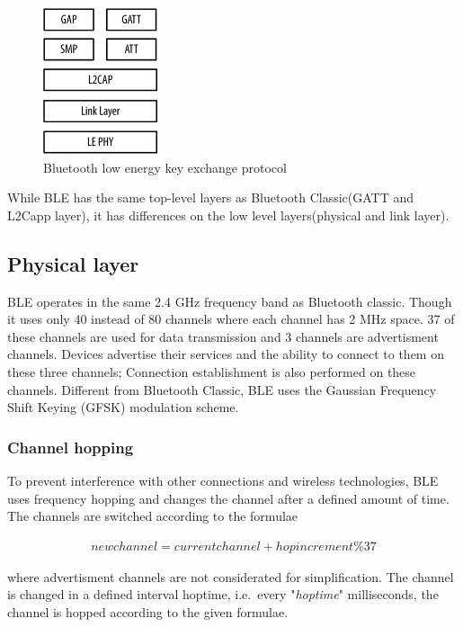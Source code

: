 \documentclass[conference]{IEEEtran}
\begin{document}
\begin{figure}
  \centering
    \includegraphics[width=0.3\textwidth]{layers}
    \caption{Bluetooth low energy key exchange protocol}
  \label{fig:layers}
\end{figure}


While BLE has the same top-level layers as Bluetooth Classic(GATT and L2Capp layer), it has differences on the low level layers(physical and link layer).

\subsection{Physical layer} \label{ssec:phy}

BLE operates in the same 2.4 GHz frequency band as Bluetooth classic. Though it uses only 40 instead of 80 channels where each channel has 2 MHz space. 37 of these channels are used for data transmission and 3 channels are advertisment channels. Devices advertise their services and the ability to connect to them on these three channels; Connection establishment is also performed on these channels. Different from Bluetooth Classic, BLE uses the Gaussian Frequency Shift Keying (GFSK) modulation scheme.

\subsubsection{Channel hopping}

To prevent interference with other connections and wireless technologies, BLE uses frequency hopping and changes the channel after a defined amount of time. The channels are switched according to the formulae

\begin{align*}
  newchannel = currentchannel+hopincrement\%37
\end{align*}

where advertisment channels are not considerated for simplification. The channel is changed in a defined interval hoptime, i.e.\ every "\emph{hoptime}" milliseconds, the channel is hopped according to the given formulae.
\end{document}
